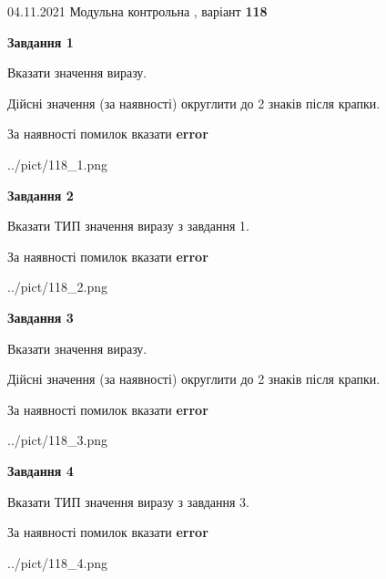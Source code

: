\documentclass[11pt, ukrainian]{article}
\begin{document}
{04.11.2021 Модульна контрольна , варіант  \No \textbf { 118 }\par}
{
\begin {large}
{\begin {center}\textbf{Завдання 1}\end {center}}\par
Вказати значення виразу. \par
Дійсні значення (за наявності) округлити до 2 знаків після крапки. \par
За наявності помилок вказати \textbf{error}

\begin{center}
	{../pict/118_1.png}
\end{center}
\newpage

{\begin {center}\textbf{Завдання 2}\end {center}}\par
Вказати ТИП значення виразу з завдання 1. \par
За наявності помилок вказати \textbf{error}

\begin{center}
	{../pict/118_2.png}
\end{center}
\newpage

{\begin {center}\textbf{Завдання 3}\end {center}}\par
Вказати значення виразу. \par
Дійсні значення (за наявності) округлити до 2 знаків після крапки. \par
За наявності помилок вказати \textbf{error}

\begin{center}
	{../pict/118_3.png}
\end{center}
\newpage

{\begin {center}\textbf{Завдання 4}\end {center}}\par
Вказати ТИП значення виразу з завдання 3. \par
За наявності помилок вказати \textbf{error}

\begin{center}
	{../pict/118_4.png}
\end{center}
\newpage


\end{large}}
\end{document}
